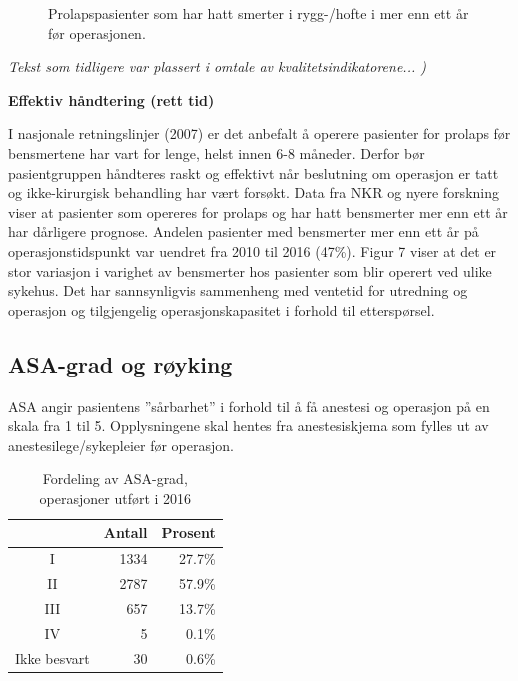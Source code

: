 \documentclass [norsk,a4paper,twoside]{article}\usepackage[]{graphicx}\usepackage[]{color}
\begin{document}
\begin{figure}[h] 
  \caption{Prolapspasienter som har hatt smerter i rygg-/hofte
			i mer enn ett år før operasjonen.}
  \label{fig:VarighSmerteRyggAvd}
\end{figure}


\textit{Tekst som tidligere var plassert i omtale av kvalitetsindikatorene... )}

\textbf{Effektiv håndtering (rett tid)}

I nasjonale retningslinjer (2007) er det anbefalt å operere pasienter for prolaps før
bensmertene har vart for lenge, helst innen 6-8 måneder. Derfor bør
pasientgruppen håndteres raskt og effektivt når beslutning om operasjon er tatt og
ikke-kirurgisk behandling har vært forsøkt. Data fra NKR og nyere forskning viser at
pasienter som opereres for prolaps og har hatt bensmerter mer enn ett år har
dårligere prognose. Andelen pasienter med bensmerter mer enn ett år på
operasjonstidspunkt var uendret fra 2010 til 2016 (47\%).
Figur 7 viser at det er stor variasjon i varighet av bensmerter hos pasienter som blir
operert ved ulike sykehus. Det har sannsynligvis sammenheng med ventetid for
utredning og operasjon og tilgjengelig operasjonskapasitet i forhold til etterspørsel.





\subsection{ASA-grad og røyking}
ASA angir pasientens ”sårbarhet” i forhold til å få anestesi og operasjon på en skala fra 1 til 5. 
Opplysningene skal hentes fra anestesiskjema som fylles ut av anestesilege/sykepleier før operasjon.
\begin{table}[ht]
\centering
\begin{tabular}{crr}
  \hline
 & Antall & Prosent \\ 
  \hline
I & 1334 & 27.7\% \\ 
  II & 2787 & 57.9\% \\ 
  III & 657 & 13.7\% \\ 
  IV & 5 & 0.1\% \\ 
  Ikke besvart & 30 & 0.6\% \\ 
   \hline
\end{tabular}
\caption{Fordeling av ASA-grad, operasjoner utført i 2016} 
\label{tab:ASA}
\end{table}
\end{document}
